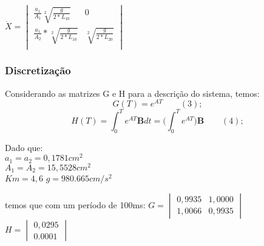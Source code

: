 \documentclass[a4paper,12pt]{article}
\begin{document}

$
\dot{X} = 
\begin{vmatrix}
\frac{a_1}{A_1} \sqrt[2]{\frac{g}{2*L_{10}}} & 0 \\  
\frac{a_1}{A_2} * \sqrt[2]{\frac{g}{2*L_{10}}} & \sqrt[2]{\frac{g}{2*L_{20}}}\\
\end{vmatrix}
$

\subsubsection{Discretiza\c{c}\~{a}o}
Considerando as matrizes G e H para a descri\c{c}\~{a}o do sistema, temos:\\

	$$G(T)=e^{AT}\,\,\,\,\,\,\,\,\,\,\,\ (3);$$
    $$H(T)=\int_{0}^{T} e^{AT}\textbf{B}dt=\bigg(\int_{0}^{T} e^{AT}\bigg)\textbf{B}\,\,\,\,\,\,\,\,\,\,\,\ (4); $$
    
    
Dado que: \\
$a_{1} = a_{2} = 0,1781 cm^2$\\
$A_{1} = A_{2} = 15,5528 cm^2$\\
$Km = 4,6$
$g = 980.665 cm/s^2$

temos que com um per\'{i}odo de 100ms:
$
G = 
\begin{vmatrix}
	0,9935 & 1,0000\\
    1,0066 & 0,9935 

\end{vmatrix}
$
$
H = 
\begin{vmatrix}
	0,0295\\
    0.0001
\end{vmatrix}
$
\end{document}
